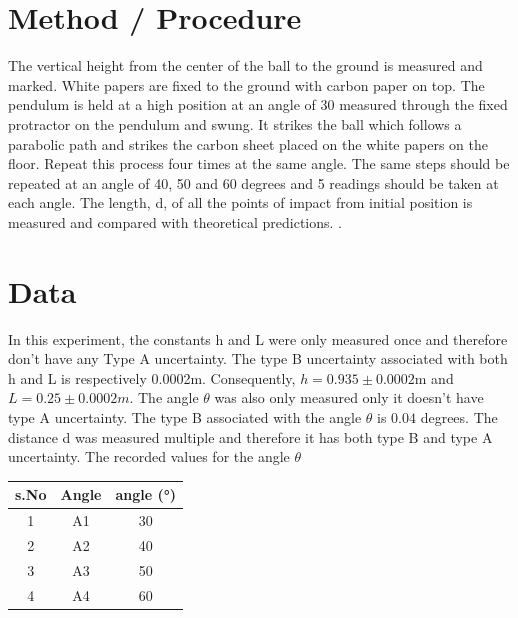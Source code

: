 \section{Method / Procedure}
The vertical height from the center of the ball to the ground is measured and marked. White papers are fixed to the ground with carbon paper on top. 
The pendulum is held at a high position at an angle of 30 measured through the fixed protractor on the pendulum and swung. It strikes the ball which follows a parabolic path and strikes the carbon sheet placed on the white papers on the floor. Repeat this process four times at the same angle. 
The same steps should be repeated at an angle of 40, 50 and 60 degrees and 5 readings should be taken at each angle. The length, d, of all the points of impact from initial position is measured and compared with theoretical predictions.  . 


\section{Data}

In this experiment, the constants h and L were only measured once and therefore don't have any Type A uncertainty. The type B uncertainty associated with both h and L is respectively  0.0002m. Consequently, $ h = 0.935 \pm 0.0002$m and $ L = 0.25 \pm 0.0002m $. The angle $\theta$ was also only measured only it doesn't have type A uncertainty. The type B associated with the angle $\theta $ is $ 0.04 $ degrees. The distance d was measured multiple and therefore it has both type B and type A uncertainty.
The recorded values for the angle $\theta$
\begin{center}
\begin{tabular}{|c|c|c|}
\hline
\textbf{s.No} & \textbf{Angle} & \textbf{angle (°)} \\ \hline
1             & A1             & 30                 \\ \hline
2             & A2             & 40                 \\ \hline
3             & A3             & 50                 \\ \hline
4             & A4             & 60                 \\ \hline
\end{tabular}
\end{center}

